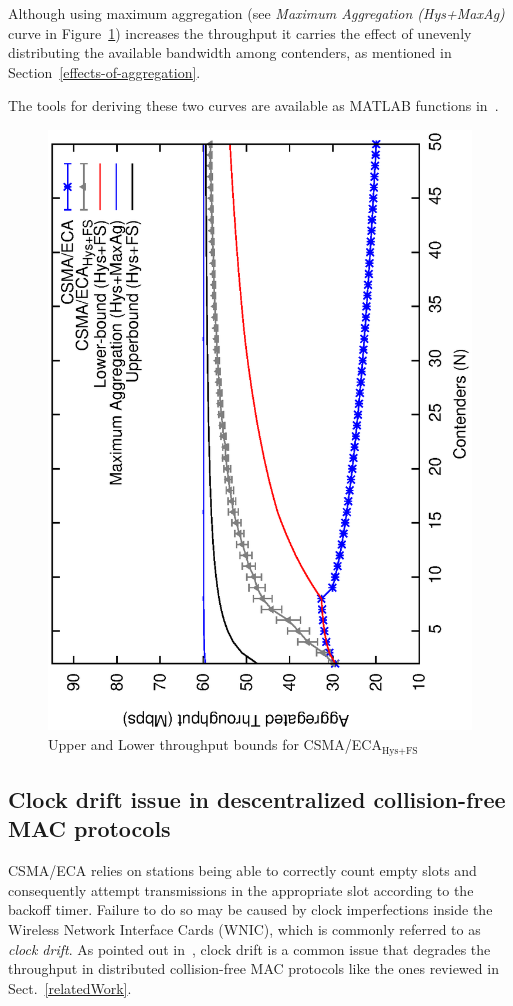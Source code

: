 \documentclass[a4paper,journal]{IEEEtran}
\begin{document}
	Although using maximum aggregation (see \emph{Maximum Aggregation (Hys+MaxAg)} curve in Figure~\ref{fig:ECA-bounds-comparison}) increases the throughput it carries the effect of unevenly distributing the available bandwidth among contenders, as mentioned in Section~\ref{effects-of-aggregation}.
	
	The tools for deriving these two curves are available as MATLAB functions in~\cite{ECA-bounds-example}. 
	
	\begin{figure}[tb]
	\centering
		\includegraphics[width=0.7\linewidth,angle=-90]{figures/throughput-w-model/throughput-combined-w-model4.eps}
		\caption{Upper and Lower throughput bounds for CSMA/ECA$_{\text{Hys+FS}}$}
		\label{fig:ECA-bounds-comparison}
	\end{figure}
	
	\subsection{Clock drift issue in descentralized collision-free MAC protocols}\label{clockDrift-issue}
	CSMA/ECA relies on stations being able to correctly count empty slots and consequently attempt transmissions in the appropriate slot according to the backoff timer. Failure to do so may be caused by clock imperfections inside the Wireless Network Interface Cards (WNIC), which is commonly referred to as \emph{clock drift}. As pointed out in~\cite{slotDrift}, clock drift is a common issue that degrades the throughput in distributed collision-free MAC protocols like the ones reviewed in Sect.~\ref{relatedWork}.
	
\end{document}
